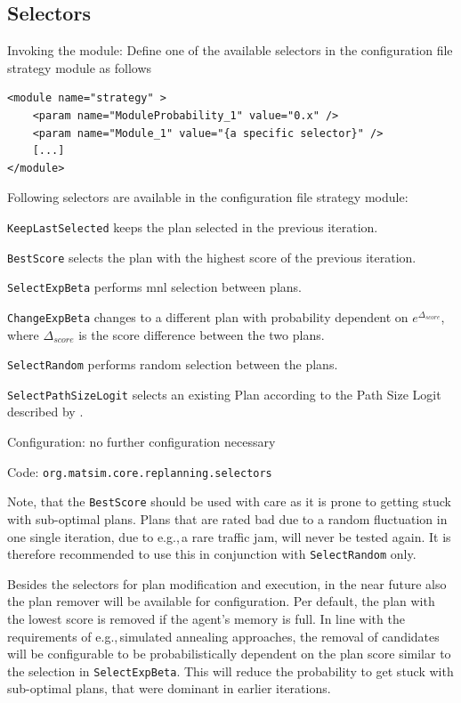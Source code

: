 \subsection{Selectors}
\label{sec:selectors}
\begin{compactitem}
\item Invoking the module: Define one of the available selectors in the configuration file strategy module as follows
%
\begin{lstlisting}
<module name="strategy" >
    <param name="ModuleProbability_1" value="0.x" />
    <param name="Module_1" value="{a specific selector}" />
    [...]
</module>
\end{lstlisting}
%
Following selectors are available in the configuration file strategy module:
%
\begin{compactitem}
	\item \lstinline|KeepLastSelected| keeps the plan selected in the previous iteration.
	\item \lstinline|BestScore| selects the plan with the highest score of the previous iteration.
	\item \lstinline|SelectExpBeta| performs \gls{mnl} selection between plans.
	\item \lstinline|ChangeExpBeta| changes to a different plan with probability dependent on $e^{\Delta_{score}}$, where $\Delta_{score}$ is the score difference between the two plans.
	\item \lstinline|SelectRandom| performs random selection between the plans.
	\item \lstinline|SelectPathSizeLogit| selects an existing Plan according to the Path Size Logit described by \citet[][]{FrejingerBierlaire_TransResB_2007}.
\end{compactitem}
%
\item Configuration: no further configuration necessary 
\item Code: \lstinline|org.matsim.core.replanning.selectors|
\end{compactitem}

Note, that the \lstinline|BestScore| should be used with care as it is prone to getting stuck with sub-optimal plans. Plans that are rated bad due to a random fluctuation in one single iteration, due to e.g.,\,a rare traffic jam, will never be tested again. It is therefore recommended to use this in conjunction with \lstinline|SelectRandom| only.

Besides the selectors for plan modification and execution, in the near future also the plan remover will be available for configuration. Per default, the plan with the lowest score is removed if the agent's memory is full. In line with the requirements of e.g.,\,simulated annealing approaches, the removal of candidates will be configurable to be probabilistically dependent on the plan score similar to the selection in \lstinline|SelectExpBeta|. This will reduce the probability to get stuck with sub-optimal plans, that were dominant in earlier iterations.

